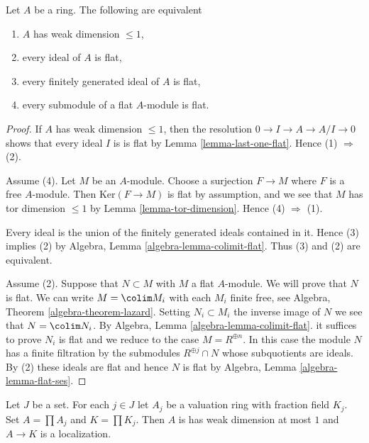 \begin{lemma}
\label{lemma-weak-dimension-at-most-1}
Let $A$ be a ring. The following are equivalent
\begin{enumerate}
\item $A$ has weak dimension $\leq 1$,
\item every ideal of $A$ is flat,
\item every finitely generated ideal of $A$ is flat,
\item every submodule of a flat $A$-module is flat.
\end{enumerate}
\end{lemma}

\begin{proof}
If $A$ has weak dimension $\leq 1$, then the resolution
$0 \to I \to A \to A/I \to 0$ shows that every ideal $I$ is
is flat by Lemma \ref{lemma-last-one-flat}.
Hence (1) $\Rightarrow$ (2).

\medskip\noindent
Assume (4). Let $M$ be an $A$-module. Choose a surjection
$F \to M$ where $F$ is a free $A$-module. Then $\text{Ker}(F \to M)$
is flat by assumption, and we see that $M$ has tor dimension
$\leq 1$ by Lemma \ref{lemma-tor-dimension}.
Hence (4) $\Rightarrow$ (1).

\medskip\noindent
Every ideal is the union of the finitely generated ideals
contained in it. Hence (3) implies (2) by
Algebra, Lemma \ref{algebra-lemma-colimit-flat}.
Thus (3) and (2) are equivalent.

\medskip\noindent
Assume (2). Suppose that $N \subset M$ with $M$ a flat $A$-module.
We will prove that $N$ is flat.
We can write $M = \colim M_i$ with each $M_i$ finite free, see
Algebra, Theorem \ref{algebra-theorem-lazard}.
Setting $N_i \subset M_i$ the inverse image of $N$ we see that
$N = \colim N_i$. By
Algebra, Lemma \ref{algebra-lemma-colimit-flat}.
it suffices to prove $N_i$ is flat and we reduce
to the case $M = R^{\oplus n}$. In this case
the module $N$ has a finite filtration by the submodules
$R^{\oplus j} \cap N$ whose subquotients are ideals.
By (2) these ideals are flat and hence $N$ is flat by
Algebra, Lemma \ref{algebra-lemma-flat-ses}.
\end{proof}

\begin{lemma}
\label{lemma-product-weak-dimension-at-most-1}
Let $J$ be a set. For each $j \in J$ let
$A_j$ be a valuation ring with fraction field $K_j$.
Set $A = \prod A_j$ and $K = \prod K_j$.
Then $A$ is has weak dimension at most $1$ and $A \to K$ is
a localization.
\end{lemma}

